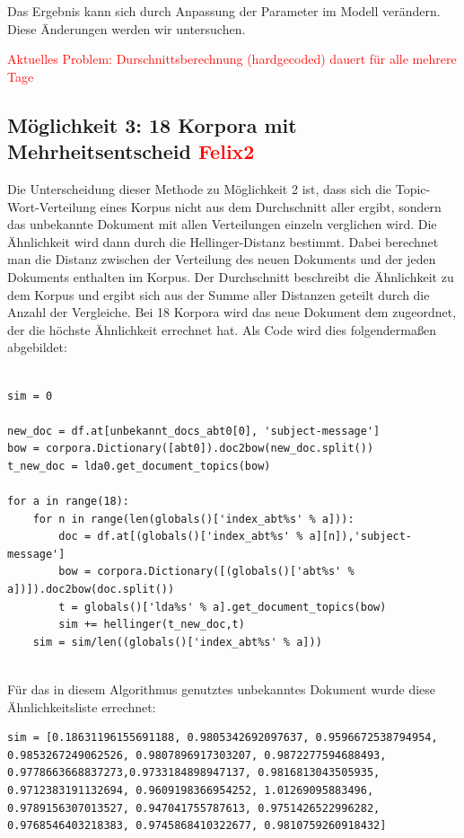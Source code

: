 \documentclass[german,version-2020-11]{uzl-thesis}
\begin{document}
Das Ergebnis kann sich durch Anpassung der Parameter im Modell verändern. Diese Änderungen werden wir untersuchen. 

\textcolor{red}{Aktuelles Problem: Durschnittsberechnung (hardgecoded) dauert für alle mehrere Tage}\\


\subsection{Möglichkeit 3: 18 Korpora mit Mehrheitsentscheid \textcolor{red}{Felix2}}
Die Unterscheidung dieser Methode zu Möglichkeit 2 ist, dass sich die Topic-Wort-Verteilung eines Korpus nicht aus dem Durchschnitt aller ergibt, sondern das unbekannte Dokument mit allen Verteilungen einzeln verglichen wird. Die Ähnlichkeit wird dann durch die Hellinger-Distanz bestimmt. Dabei berechnet man die Distanz zwischen der Verteilung des neuen Dokuments und der jeden Dokuments enthalten im Korpus. Der Durchschnitt beschreibt die Ähnlichkeit zu dem Korpus und ergibt sich aus der Summe aller Distanzen geteilt durch die Anzahl der Vergleiche. Bei 18 Korpora wird das neue Dokument dem zugeordnet, der die höchste Ähnlichkeit errechnet hat. Als Code wird dies folgendermaßen abgebildet: \\

\begin{lstlisting}

sim = 0

new_doc = df.at[unbekannt_docs_abt0[0], 'subject-message']
bow = corpora.Dictionary([abt0]).doc2bow(new_doc.split())
t_new_doc = lda0.get_document_topics(bow) 

for a in range(18):
    for n in range(len(globals()['index_abt%s' % a])):
        doc = df.at[(globals()['index_abt%s' % a][n]),'subject-message']
        bow = corpora.Dictionary([(globals()['abt%s' % a])]).doc2bow(doc.split())
        t = globals()['lda%s' % a].get_document_topics(bow)
        sim += hellinger(t_new_doc,t)
    sim = sim/len((globals()['index_abt%s' % a]))

\end{lstlisting}\\


Für das in diesem Algorithmus genutztes unbekanntes Dokument wurde diese Ähnlichkeitsliste errechnet: \\

\begin{lstlisting}
sim = [0.18631196155691188, 0.9805342692097637, 0.9596672538794954,  0.9853267249062526, 0.9807896917303207, 0.9872277594688493, 0.9778663668837273,0.9733184898947137, 0.9816813043505935, 0.9712383191132694, 0.9609198366954252, 1.01269095883496, 0.9789156307013527, 0.947041755787613, 0.9751426522996282, 0.9768546403218383, 0.9745868410322677, 0.9810759260918432]
\end{lstlisting}\\
\end{document}
